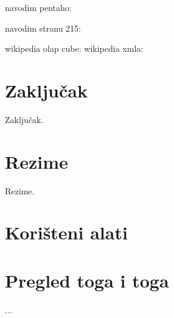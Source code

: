 \documentclass[times, utf8, seminar]{fit}
\begin{document}
navodim pentaho: \cite{pentaho32}

navodim stranu 215: \cite[str.~215]{pentaho32}

wikipedia olap cube: \cite{web:wikipedia:olap_cube}
wikipedia xmla: \cite{web:wikipedia:xmla}




\chapter{Zaključak}
Zaključak.




\chapter{Rezime}
Rezime.

\appendix

\chapter{Korišteni alati}

\chapter{Pregled toga i toga}

...
\end{document}
